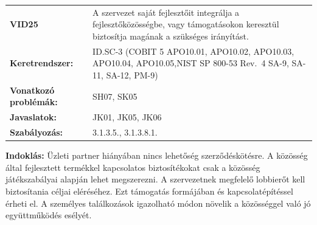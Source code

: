 \documentclass[12pt,magyar,a4paper,oneside]{scrreprt}
\begin{document}
\begin{longtable}[]{@{}ll@{}}
\toprule
\endhead
\begin{minipage}[t]{0.16\columnwidth}\raggedright
\textbf{VID25}\strut
\end{minipage} & \begin{minipage}[t]{0.79\columnwidth}\raggedright
A szervezet saját fejlesztőit integrálja a fejlesztőközösségbe, vagy
támogatásokon keresztül biztosítja magának a szükséges irányítást.\strut
\end{minipage}\tabularnewline
\begin{minipage}[t]{0.16\columnwidth}\raggedright
\textbf{Keretrendszer:}\strut
\end{minipage} & \begin{minipage}[t]{0.79\columnwidth}\raggedright
ID.SC-3 (COBIT 5 APO10.01, APO10.02, APO10.03, APO10.04, APO10.05,NIST
SP 800-53 Rev.~4 SA-9, SA-11, SA-12, PM-9)\strut
\end{minipage}\tabularnewline
\begin{minipage}[t]{0.16\columnwidth}\raggedright
\textbf{Vonatkozó problémák:}\strut
\end{minipage} & \begin{minipage}[t]{0.79\columnwidth}\raggedright
SH07, SK05\strut
\end{minipage}\tabularnewline
\begin{minipage}[t]{0.16\columnwidth}\raggedright
\textbf{Javaslatok:}\strut
\end{minipage} & \begin{minipage}[t]{0.79\columnwidth}\raggedright
JK01, JK05, JK06\strut
\end{minipage}\tabularnewline
\begin{minipage}[t]{0.16\columnwidth}\raggedright
\textbf{Szabályozás:}\strut
\end{minipage} & \begin{minipage}[t]{0.79\columnwidth}\raggedright
3.1.3.5., 3.1.3.8.1.\strut
\end{minipage}\tabularnewline
\bottomrule
\end{longtable}

\textbf{Indoklás: } Üzleti partner hiányában nincs lehetőség
szerződéskötésre. A közösség által fejlesztett termékkel kapcsolatos
biztosítékokat csak a közösség játékszabályai alapján lehet megszerezni.
A szervezetnek megfelelő lobbierőt kell biztosítania céljai eléréséhez.
Ezt támogatás formájában és kapcsolatépítéssel érheti el. A személyes
találkozások igazolható módon növelik a közösséggel való jó
együttműködés esélyét.
\end{document}
